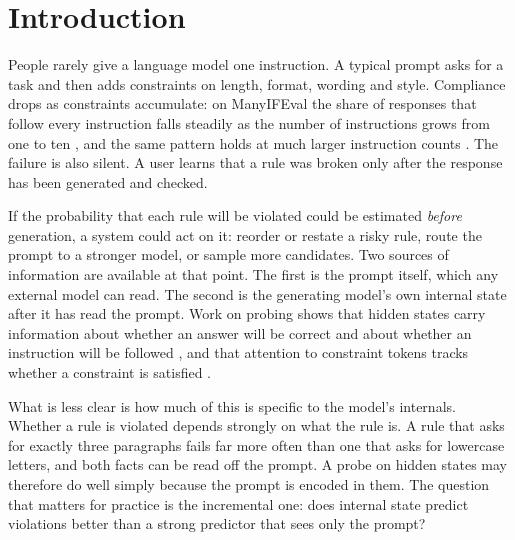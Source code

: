 \documentclass[10pt]{article}
\begin{document}
\section{Introduction}

People rarely give a language model one instruction. A typical prompt asks for a task and then adds constraints on
length, format, wording and style. Compliance drops as constraints accumulate: on ManyIFEval the share of responses
that follow every instruction falls steadily as the number of instructions grows from one to ten
\citep{harada2025instructions}, and the same pattern holds at much larger instruction counts
\citep{jaroslawicz2025many}. The failure is also silent. A user learns that a rule was broken only after the response
has been generated and checked.

If the probability that each rule will be violated could be estimated \emph{before} generation, a system could act on
it: reorder or restate a risky rule, route the prompt to a stronger model, or sample more candidates. Two sources of
information are available at that point. The first is the prompt itself, which any external model can read. The second
is the generating model's own internal state after it has read the prompt. Work on probing shows that hidden states
carry information about whether an answer will be correct \citep{azaria2023internal,kadavath2022know,orgad2025llms} and
about whether an instruction will be followed \citep{heo2025know}, and that attention to constraint tokens tracks
whether a constraint is satisfied \citep{yuksekgonul2024attention}.

What is less clear is how much of this is specific to the model's internals. Whether a rule is violated depends
strongly on what the rule is. A rule that asks for exactly three paragraphs fails far more often than one that asks for
lowercase letters, and both facts can be read off the prompt. A probe on hidden states may therefore do well simply
because the prompt is encoded in them. The question that matters for practice is the incremental one: does internal
state predict violations better than a strong predictor that sees only the prompt?
\end{document}
